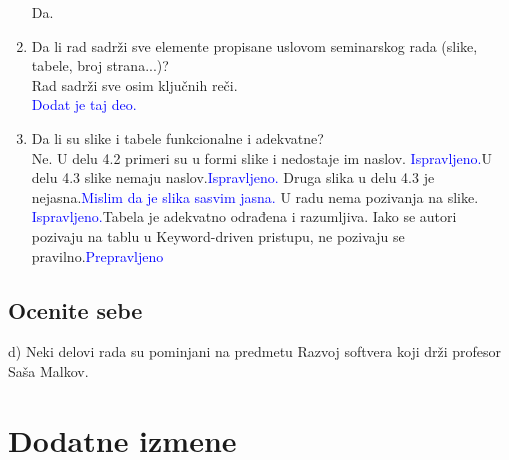 \documentclass[a4paper]{report}
\newcommand{\odgovor}[1]{\textcolor{blue}{#1}}
\begin{document}
\begin{enumerate}
Da.\\
\item Da li rad sadrži sve elemente propisane uslovom seminarskog rada (slike, tabele, broj strana...)?\\
Rad sadrži sve osim ključnih reči.\\
\odgovor{Dodat je taj deo.}
\item Da li su slike i tabele funkcionalne i adekvatne?\\
Ne. U delu 4.2 primeri su u formi slike i nedostaje im naslov. \odgovor{Ispravljeno.}U delu 4.3 slike nemaju naslov.\odgovor{Ispravljeno.} Druga slika u delu 4.3 je nejasna.\odgovor{Mislim da je slika sasvim jasna.} U radu nema pozivanja na slike. \odgovor{Ispravljeno.}Tabela je adekvatno odrađena i razumljiva. Iako se autori pozivaju na tablu u Keyword-driven pristupu, ne pozivaju se pravilno.\odgovor{Prepravljeno} \\

\end{enumerate}

\section{Ocenite sebe}
d) Neki delovi rada su pominjani na predmetu Razvoj softvera koji drži profesor Saša Malkov.\\


\chapter{Dodatne izmene}
\end{document}
